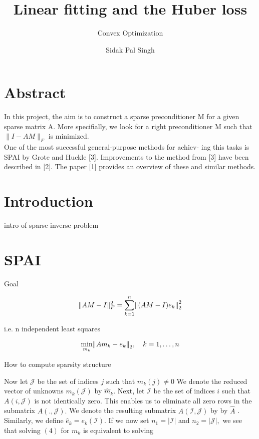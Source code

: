 \documentclass[paper=A4, fontsize=11pt]{scrartcl}
\title{Linear fitting and the Huber loss}
\subtitle{Convex Optimization}
\author{Sidak Pal Singh}
\let\originalleft\left
\let\originalright\right
\renewcommand{\left}{\mathopen{}\mathclose\bgroup\originalleft}
\renewcommand{\right}{\aftergroup\egroup\originalright}
\begin{document}
	\maketitle
	
	\section{Abstract}
	
	In this project, the aim is to construct a sparse preconditioner M for a given sparse matrix A. More specifially, we look for a right preconditioner M such that $\|I-A M\|_{F}$ is minimized. \\
	One of the most successful general-purpose methods for achiev- ing this tasks is SPAI by Grote and Huckle [3]. Improvements to the method from [3] have been described in [2]. The paper [1] provides an overview of these and similar methods.
	
	
	\section{Introduction}
	
	intro of sparse inverse problem
	
	\newpage
	
	\section{SPAI}
	
	Goal
	
	\begin{equation}
	\|A M-I\|_{F}^{2}=\sum_{k=1}^{n}\left\|(A M-I) e_{k}\right\|_{2}^{2}
	\end{equation}
	
	i.e. n independent least squares
	
	
	\begin{equation}
	\min _{m_{k}}\left\|A m_{k}-e_{k}\right\|_{2}, \quad k=1, \ldots, n
	\end{equation}
	
	
	How to compute sparsity structure 
	
	Now let \(\mathcal{J}\) be the set of indices \(j\) such that \(m_{k}(j) \neq 0\) We denote the reduced vector of unknowns \(m_{k}(\mathcal{J})\) by \(\hat{m}_{k} .\) Next, let \(\mathcal{I}\) be the set of
	indices \(i\) such that \(A(i, \mathcal{J})\) is not identically zero. This enables us to eliminate all zero rows in the submatrix \(A( ., \mathcal{J}) .\) We denote the resulting submatrix \(A(\mathcal{I}, \mathcal{J})\) by by
	\(\hat{A}\) . Similarly, we define \(\hat{e}_{k}=e_{k}(\mathcal{I}) .\) If we now set \(n_{1}=|\mathcal{I}|\) and \(n_{2}=|\mathcal{J}|,\) we see that
	solving \((4)\) for \(m_{k}\) is equivalent to solving
	
\end{document}
